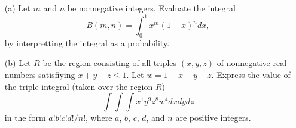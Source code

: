 \begin{enumerate}
	\item[(a)] Let $m$ and $n$ be nonnegative integers.
		Evaluate the integral
		$$B(m,n) = \int_0^1 x^m(1-x)^n dx,$$
		by interpretting the integral as a probability.
	\item[(b)] Let $R$ be the region consisting of all triples $(x, y, z)$ of nonnegative real numbers satisfiying $x + y + z \le 1$.
		Let $w = 1 - x - y - z$.
		Express the value of the triple integral (taken over the region $R$)
		$$\int\int\int x^1y^9z^8w^4 dx dy dz$$
		in the form $a!b!c!d!/n!$, where $a$, $b$, $c$, $d$, and $n$ are positive integers.
\end{enumerate}
